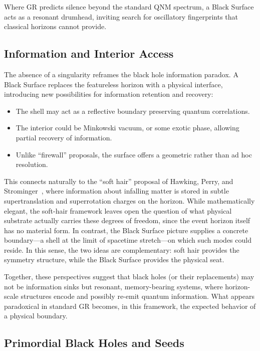 \documentclass[12pt]{article}
\begin{document}
Where GR predicts silence beyond the standard QNM spectrum, a Black Surface acts as a resonant drumhead, inviting search for oscillatory fingerprints that classical horizons cannot provide.

\subsection{Information and Interior Access}

The absence of a singularity reframes the black hole information paradox. A Black Surface replaces the featureless horizon with a physical interface, introducing new possibilities for information retention and recovery:

\begin{itemize}
    \item The shell may act as a reflective boundary preserving quantum correlations.
    \item The interior could be Minkowski vacuum, or some exotic phase, allowing partial recovery of information.
    \item Unlike ``firewall'' proposals, the surface offers a geometric rather than ad hoc resolution.
\end{itemize}

This connects naturally to the ``soft hair'' proposal of Hawking, Perry, and Strominger~\cite{hawking2016soft,hawking2018soft}, where information about infalling matter is stored in subtle supertranslation and superrotation charges on the horizon. While mathematically elegant, the soft-hair framework leaves open the question of what physical substrate actually carries these degrees of freedom, since the event horizon itself has no material form. In contrast, the Black Surface picture supplies a concrete boundary---a shell at the limit of spacetime stretch---on which such modes could reside. In this sense, the two ideas are complementary: soft hair provides the symmetry structure, while the Black Surface provides the physical seat.

Together, these perspectives suggest that black holes (or their replacements) may not be information sinks but resonant, memory-bearing systems, where horizon-scale structures encode and possibly re-emit quantum information. What appears paradoxical in standard GR becomes, in this framework, the expected behavior of a physical boundary.

\subsection{Primordial Black Holes and Seeds}
\end{document}
